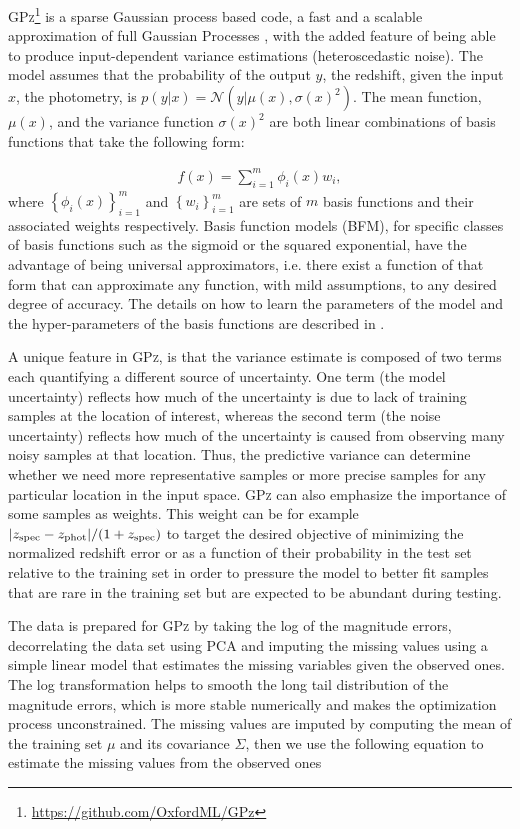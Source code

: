 \textsc{GPz}\footnote{\url{https://github.com/OxfordML/GPz}} \citep{Almosallam:16a,Almosallam:15b} is a sparse Gaussian process based code, a fast and a scalable approximation of full Gaussian Processes \citep{Rasmussen:06}, with the added feature of being able to produce input-dependent variance estimations (heteroscedastic noise). The model assumes that the probability of the output $y$, the redshift, given the input $x$, the photometry, is $p(y|x)=\mathcal{N}\left(y|\mu(x),\sigma(x)^{2}\right)$. The mean function, $\mu(x)$, and the variance function $\sigma(x)^{2}$ are both linear combinations of basis functions that take the following form:

\begin{align}
f(x)=\sum_{i=1}^{m}\phi_{i}(x)w_{i},
\end{align}
where $\left\{\phi_{i}(x)\right\}_{i=1}^{m}$ and $\left\{w_{i}\right\}_{i=1}^{m}$ are sets of $m$ basis functions and their associated weights respectively. Basis function models (BFM), for specific classes of basis functions such as the sigmoid or the squared exponential, have the advantage of being universal approximators, i.e. there exist a function of that form that can approximate any function, with mild assumptions, to any desired degree of accuracy. The details on how to learn the parameters of the model and the hyper-parameters of the basis functions are described in \citet{Almosallam:15b}.

A unique feature in \textsc{GPz}, is that the variance estimate is composed of two terms each quantifying a different source of uncertainty. One term (the model uncertainty) reflects how much of the uncertainty is due to lack of training samples at the location of interest, whereas the second term (the noise uncertainty) reflects how much of the uncertainty is caused from observing many noisy samples at that location. Thus, the predictive variance can determine whether we need more representative samples or more precise samples for any particular location in the input space. \textsc{GPz} can also emphasize the importance of some samples as weights. This weight can be for example $|z_{\rm{spec}}-z_{\rm{phot}}|/(1+z_{\rm{spec}})$ to target the desired objective of minimizing the normalized redshift error or as a function of their probability in the test set relative to the training set in order to pressure the model to better fit samples that are rare in the training set but are expected to be abundant during testing.

The data is prepared for \textsc{GPz} by taking the log of the magnitude errors, decorrelating the data set using PCA and imputing the missing values using a simple linear model that estimates the missing variables given the observed ones. The log transformation helps to smooth the long tail distribution of the magnitude errors, which is more stable numerically and makes the optimization process unconstrained. The missing values are imputed by computing the mean of the training set $\mu$ and its covariance $\Sigma$, then we use the following equation to estimate the missing values from the observed ones %


